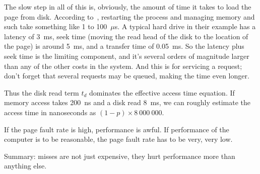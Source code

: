 The slow step in all of this is, obviously, the amount of time it takes to load the page from disk. According to~\cite{osc}, restarting the process and managing memory and such take something like 1 to 100~$\mu$s. A typical hard drive in their example has a latency of 3~ms, seek time (moving the read head of the disk to the location of the page) is around 5~ms, and a transfer time of 0.05~ms. So the latency plus seek time is the limiting component, and it's several orders of magnitude larger than any of the other costs in the system. And this is for servicing a request; don't forget that several requests may be queued, making the time even longer.

Thus the disk read term $t_{d}$ dominates the effective access time equation. If memory access takes 200~ns and a disk read 8~ms, we can roughly estimate the access time in nanoseconds as $(1-p) \times 8~000~000$. 

If the page fault rate is high, performance is awful. If performance of the computer is to be reasonable, the page fault rate has to be very, very low.

Summary: misses are not just expensive, they hurt performance more than anything else.





